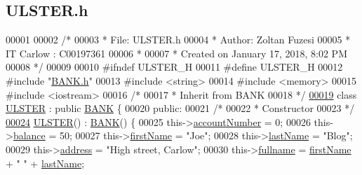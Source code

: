\hypertarget{_u_l_s_t_e_r_8h_source}{}\subsection{U\+L\+S\+T\+E\+R.\+h}

\begin{DoxyCode}
00001 
00002 \textcolor{comment}{/* }
00003 \textcolor{comment}{ * File:   ULSTER.h}
00004 \textcolor{comment}{ * Author: Zoltan Fuzesi}
00005 \textcolor{comment}{ * IT Carlow : C00197361}
00006 \textcolor{comment}{ *}
00007 \textcolor{comment}{ * Created on January 17, 2018, 8:02 PM}
00008 \textcolor{comment}{ */}
00009 
00010 \textcolor{preprocessor}{#ifndef ULSTER\_H}
00011 \textcolor{preprocessor}{#define ULSTER\_H}
00012 \textcolor{preprocessor}{#include "\hyperlink{_b_a_n_k_8h}{BANK.h}"}
00013 \textcolor{preprocessor}{#include <string>}
00014 \textcolor{preprocessor}{#include <memory>}
00015 \textcolor{preprocessor}{#include <iostream>}
00016 \textcolor{comment}{/*}
00017 \textcolor{comment}{ * Inherit from BANK}
00018 \textcolor{comment}{ */}
\hypertarget{_u_l_s_t_e_r_8h_source.tex_l00019}{}\hyperlink{class_u_l_s_t_e_r}{00019} \textcolor{keyword}{class }\hyperlink{class_u_l_s_t_e_r}{ULSTER} : \textcolor{keyword}{public} \hyperlink{class_b_a_n_k}{BANK} \{
00020 \textcolor{keyword}{public}:
00021     \textcolor{comment}{/*}
00022 \textcolor{comment}{     * Constructor}
00023 \textcolor{comment}{     */}
\hypertarget{_u_l_s_t_e_r_8h_source.tex_l00024}{}\hyperlink{class_u_l_s_t_e_r_a637ad8cb5537167ab51cd079637a8323_a637ad8cb5537167ab51cd079637a8323}{00024}     \hyperlink{class_u_l_s_t_e_r_a637ad8cb5537167ab51cd079637a8323_a637ad8cb5537167ab51cd079637a8323}{ULSTER}() : \hyperlink{class_b_a_n_k}{BANK}() \{
00025         this->\hyperlink{class_u_l_s_t_e_r_a13f0c2ce30f9e66e896633d81c9af979_a13f0c2ce30f9e66e896633d81c9af979}{accountNumber} = 0;
00026         this->\hyperlink{class_u_l_s_t_e_r_af98d3ed41f452b28f26994552465815c_af98d3ed41f452b28f26994552465815c}{balance} = 50;
00027         this->\hyperlink{class_u_l_s_t_e_r_af8d138fdca14b59130b8b4ddd3d73b16_af8d138fdca14b59130b8b4ddd3d73b16}{firstName} = \textcolor{stringliteral}{"Joe"};
00028         this->\hyperlink{class_u_l_s_t_e_r_afa319e559a6a7653aa67e6d8f801d7ee_afa319e559a6a7653aa67e6d8f801d7ee}{lastName} = \textcolor{stringliteral}{"Blog"};
00029         this->\hyperlink{class_u_l_s_t_e_r_a7a13c5988ddafa47b8d6eea3e77fd786_a7a13c5988ddafa47b8d6eea3e77fd786}{address} = \textcolor{stringliteral}{"High street, Carlow"};
00030         this->\hyperlink{class_u_l_s_t_e_r_a5dc42cbd515825463ba31c8d3dcfe1b6_a5dc42cbd515825463ba31c8d3dcfe1b6}{fullname} = \hyperlink{class_u_l_s_t_e_r_af8d138fdca14b59130b8b4ddd3d73b16_af8d138fdca14b59130b8b4ddd3d73b16}{firstName} + \textcolor{stringliteral}{" "} + \hyperlink{class_u_l_s_t_e_r_afa319e559a6a7653aa67e6d8f801d7ee_afa319e559a6a7653aa67e6d8f801d7ee}{lastName};

\end{DoxyCode}
